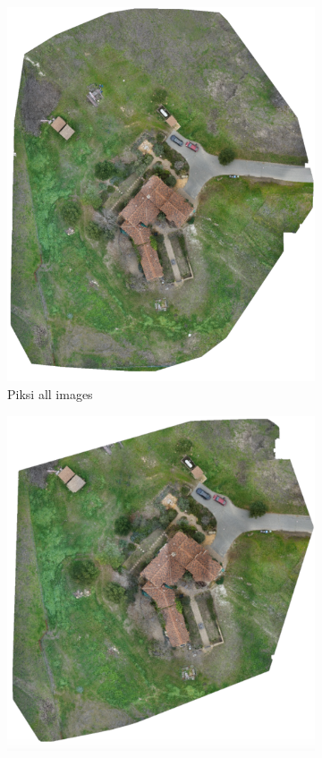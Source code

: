 \documentclass{article}
\begin{document}
\begin{figure}
\centering
\renewcommand*\thesubfigure{\arabic{subfigure}}
\begin{subfigure}{.33\textwidth}
  \centering
  \includegraphics[width=.75\linewidth]{images/orthomosaics/p.png}
  \caption{Piksi all images}
  \label{fig:sub1}
\end{subfigure}%
\begin{subfigure}{.33\textwidth}
  \centering
  \includegraphics[width=.75\linewidth]{images/orthomosaics/p_every_other_line.png}

\end{subfigure}
\end{figure}
\end{document}
